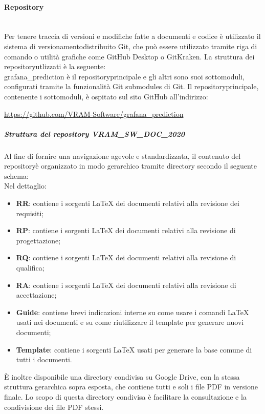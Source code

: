	\paragraph{Repository}\mbox{}\\ [1mm]
		Per tenere traccia di versioni e modifiche fatte a documenti e codice è utilizzato il sistema di versionamento\glosp distribuito Git, che può essere utilizzato tramite riga di comando o utilità grafiche come GitHub Desktop o GitKraken.
		La struttura dei repository\glosp utlizzati è la seguente:
		\newline
		\mbox{}\\ %
		grafana\_prediction è il repository\glosp principale e gli altri sono suoi sottomoduli, configurati tramite la funzionalità Git submodules di Git.
		Il repository\glosp principale, contenente i sottomoduli, è ospitato sul sito GitHub all'indirizzo: 
		\begin{center}
			\url{https://github.com/VRAM-Software/grafana_prediction}
		\end{center}
		\subparagraph*{Struttura del repository VRAM\_SW\_DOC\_2020}
		Al fine di fornire una navigazione agevole e standardizzata, il contenuto del repository\glosp è organizzato in modo gerarchico tramite directory secondo il seguente schema:
		\newline
		\mbox{}\\ %
		Nel dettaglio:
		\begin{itemize}
			\item \textbf{RR}: contiene i sorgenti \LaTeX \xspace dei documenti relativi alla revisione dei requisiti;
			\item \textbf{RP}: contiene i sorgenti \LaTeX \xspace dei documenti relativi alla revisione di progettazione\glo;
			\item \textbf{RQ}: contiene i sorgenti \LaTeX \xspace dei documenti relativi alla revisione di qualifica;
			\item \textbf{RA}: contiene i sorgenti \LaTeX \xspace dei documenti relativi alla revisione di accettazione; 
			\item \textbf{Guide}: contiene brevi indicazioni interne su come usare i comandi \LaTeX \xspace usati nei documenti e su come riutilizzare il template per generare nuovi documenti;
			\item \textbf{Template}: contiene i sorgenti \LaTeX \xspace usati per generare la base comune di tutti i documenti.
		\end{itemize}
		È inoltre disponibile una directory condivisa su Google Drive, con la stessa struttura gerarchica sopra esposta, che contiene tutti e soli i file PDF in versione finale. Lo scopo di questa directory condivisa è facilitare la consultazione e la condivisione dei file PDF stessi.
		
